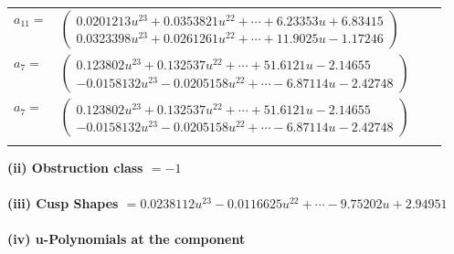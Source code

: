 \documentclass[1p]{elsarticle_modified}
\theoremstyle{definition}
\begin{document}
\begin{tabular}{m{7pt} m{180pt} m{7pt} m{180pt} }
\flushright $a_{11}=$&$\begin{pmatrix}0.0201213 u^{23}+0.0353821 u^{22}+\cdots+6.23353 u+6.83415\\0.0323398 u^{23}+0.0261261 u^{22}+\cdots+11.9025 u-1.17246\end{pmatrix}$ \\
\flushright $a_{7}=$&$\begin{pmatrix}0.123802 u^{23}+0.132537 u^{22}+\cdots+51.6121 u-2.14655\\-0.0158132 u^{23}-0.0205158 u^{22}+\cdots-6.87114 u-2.42748\end{pmatrix}$\\ \flushright $a_{7}=$&$\begin{pmatrix}0.123802 u^{23}+0.132537 u^{22}+\cdots+51.6121 u-2.14655\\-0.0158132 u^{23}-0.0205158 u^{22}+\cdots-6.87114 u-2.42748\end{pmatrix}$\\&\end{tabular}
\flushleft \textbf{(ii) Obstruction class $= -1$}\\~\\
\flushleft \textbf{(iii) Cusp Shapes $= 0.0238112 u^{23}-0.0116625 u^{22}+\cdots-9.75202 u+2.94951$}\\~\\
\newpage\renewcommand{\arraystretch}{1}
\flushleft \textbf{(iv) u-Polynomials at the component}\newline \\
\end{document}
